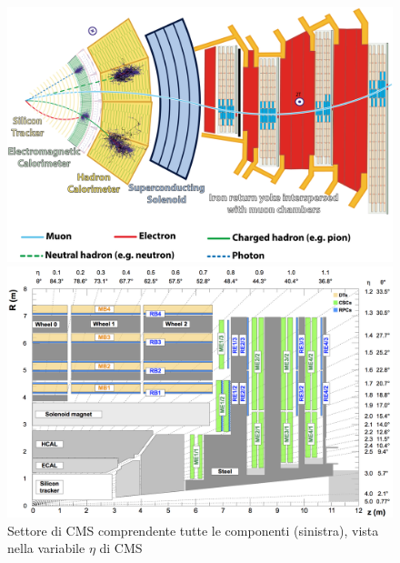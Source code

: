 \begin{figure}[t]
  \centering
  \begin{minipage}[b]{0.45\textwidth}
      \centering
      \includegraphics[width=\textwidth]{../ImmaginiTesi/CMS slice.png} 
  \end{minipage}
  \hfill 
  \begin{minipage}[b]{0.45\textwidth}
      \centering
      \includegraphics[width=\textwidth]{../ImmaginiTesi/CMSEtaView.png} 
  \end{minipage}
  \caption{Settore di CMS comprendente tutte le componenti (sinistra), vista nella variabile $\eta$ di CMS}
  \label{fig:SectorEtaView}
\end{figure}













